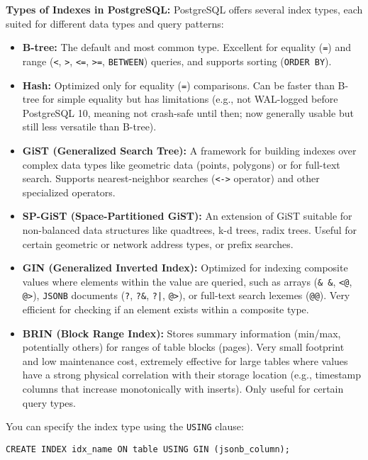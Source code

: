 \documentclass[12pt]{book}
\begin{document}
\textbf{Types of Indexes in PostgreSQL:}
PostgreSQL offers several index types, each suited for different data types and query patterns:
\begin{itemize}
    \item \textbf{B-tree:} The default and most common type. Excellent for equality (\texttt{=}) and range (\texttt{<}, \texttt{>}, \texttt{<=}, \texttt{>=}, \texttt{BETWEEN}) queries, and supports sorting (\texttt{ORDER BY}).
    \item \textbf{Hash:} Optimized only for equality (\texttt{=}) comparisons. Can be faster than B-tree for simple equality but has limitations (e.g., not WAL-logged before PostgreSQL 10, meaning not crash-safe until then; now generally usable but still less versatile than B-tree).
    \item \textbf{GiST (Generalized Search Tree):} A framework for building indexes over complex data types like geometric data (points, polygons) or for full-text search. Supports nearest-neighbor searches (\texttt{<->} operator) and other specialized operators.
    \item \textbf{SP-GiST (Space-Partitioned GiST):} An extension of GiST suitable for non-balanced data structures like quadtrees, k-d trees, radix trees. Useful for certain geometric or network address types, or prefix searches.
    \item \textbf{GIN (Generalized Inverted Index):} Optimized for indexing composite values where elements within the value are queried, such as arrays (\texttt{\& \&}, \texttt{<@}, \texttt{@>}), \texttt{JSONB} documents (\texttt{?}, \texttt{?\&}, \texttt{?|}, \texttt{@>}), or full-text search lexemes (\texttt{@@}). Very efficient for checking if an element exists within a composite type.
    \item \textbf{BRIN (Block Range Index):} Stores summary information (min/max, potentially others) for ranges of table blocks (pages). Very small footprint and low maintenance cost, extremely effective for large tables where values have a strong physical correlation with their storage location (e.g., timestamp columns that increase monotonically with inserts). Only useful for certain query types.
\end{itemize}

You can specify the index type using the \texttt{USING} clause:
\begin{lstlisting}[caption={Specifying Index Type}, label=lst:create_index_type]
CREATE INDEX idx_name ON table USING GIN (jsonb_column);
\end{lstlisting}
\end{document}
